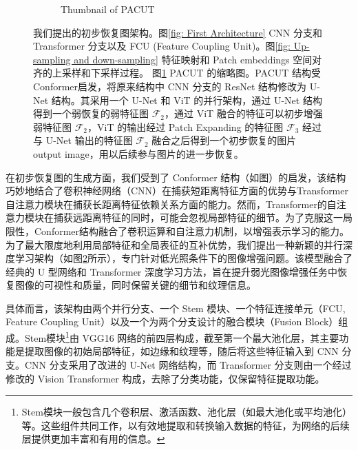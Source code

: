 \documentclass[a4paper]{ctexart}
\begin{document}
\begin{figure}[htb]
\begin{subfigure}{0.4\textwidth}
			\captionsetup{font=scriptsize}
			\caption{Thumbnail of PACUT}
			\label{fig: The proposed initial architecture(Abstract Picture)}	
		\end{subfigure}
		\caption{
			\label{fig: PACUT}
			我们提出的初步恢复图架构。图\ref{fig: First Architecture} CNN 分支和 Transformer 分支以及 FCU (Feature Coupling Unit)。图\ref{fig: Up-sampling and down-sampling} 特征映射和 Patch embeddings 空间对齐的上采样和下采样过程。 图\ref{fig: The proposed initial architecture(Abstract Picture)} PACUT 的缩略图。PACUT 结构受 Conformer\cite{peng2021conformer}启发，将原来结构中 CNN 分支的 ResNet 结构修改为 U-Net 结构。其采用一个 U-Net 和 ViT 的并行架构，通过 U-Net 结构得到一个弱恢复的弱特征图 $\mathcal{F}_2$，通过 ViT 融合的特征可以初步增强弱特征图 $\mathcal{F}_2$，ViT 的输出经过 Patch Expanding 的特征图 $\mathcal{F}_3$ 经过与 U-Net 输出的特征图 $\mathcal{F}_2$ 融合之后得到一个初步恢复的图片 output image，用以后续参与图片的进一步恢复。
		}
	\end{figure}
	\FloatBarrier
	
	在初步恢复图的生成方面，我们受到了 Conformer 结构\cite{peng2021conformer}（如图）的启发，该结构巧妙地结合了卷积神经网络（CNN）在捕获短距离特征\cite{jain1991unsupervised, lowe2004distinctive, ojala2002multiresolution}方面的优势与Transformer自注意力模块在捕获长距离特征\cite{lisin2005combining}依赖关系方面的能力。然而，Transformer的自注意力模块在捕获远距离特征的同时，可能会忽视局部特征的细节。为了克服这一局限性，Conformer结构融合了卷积运算和自注意力机制，以增强表示学习的能力。为了最大限度地利用局部特征和全局表征的互补优势，我们提出一种新颖的并行深度学习架构（如图\ref{fig: PACUT}所示），专门针对低光照条件下的图像增强问题。该模型融合了经典的 U 型网络和 Transformer 深度学习方法，旨在提升弱光图像增强任务中恢复图像的可视性和质量，同时保留关键的细节和纹理\cite{karu1996there}信息。
	
	具体而言，该架构由两个并行分支、一个 Stem 模块、一个特征连接单元（FCU, Feature Coupling Unit）以及一个为两个分支设计的融合模块（Fusion Block）组成。Stem模块\footnote{Stem模块一般包含几个卷积层、激活函数、池化层（如最大池化或平均池化）等。这些组件共同工作，以有效地提取和转换输入数据的特征，为网络的后续层提供更加丰富和有用的信息。}由 VGG16 网络的前四层构成\cite{szegedy2016rethinking}，截至第一个最大池化层，其主要功能是提取图像的初始局部特征，如边缘和纹理等，随后将这些特征输入到 CNN 分支。CNN 分支采用了改进的 U-Net 网络结构，而 Transformer 分支则由一个经过修改的 Vision Transformer 构成，去除了分类功能，仅保留特征提取功能。
	
\end{document}
